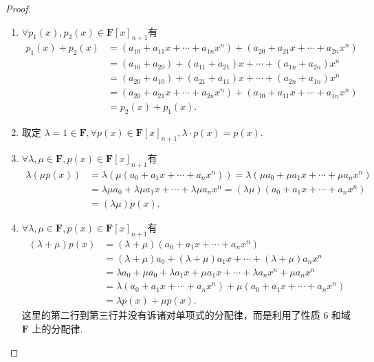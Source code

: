 \begin{proof}
\begin{enumerate}
        \item $\forall p_1(x), p_2(x) \in \mathbf{F}[x]_{n+1}$有
              \begin{align*}
                  p_1(x) + p_2(x)
                   & = (a_{10} + a_{11}x + \cdots + a_{1n}x^n) + (a_{20} + a_{21}x + \cdots + a_{2n}x^n) \\
                   & = (a_{10} + a_{20}) + (a_{11} + a_{21})x + \cdots + (a_{1n} + a_{2n})x^n            \\
                   & = (a_{20} + a_{10}) + (a_{21} + a_{11})x + \cdots + (a_{2n} + a_{1n})x^n            \\
                   & = (a_{20} + a_{21}x + \cdots + a_{2n}x^n) + (a_{10} + a_{11}x + \cdots + a_{1n}x^n) \\
                   & = p_2(x) + p_1(x).
              \end{align*}

        \item 取定 $\lambda = 1 \in \mathbf{F},\forall p(x) \in \mathbf{F}[x]_{n+1}, \lambda \cdot p(x) = p(x)$.

        \item $\forall \lambda, \mu \in \mathbf{F}, p(x) \in \mathbf{F}[x]_{n+1}$有
              \begin{align*}
                  \lambda(\mu p(x)) & = \lambda(\mu(a_0 + a_1x + \cdots + a_nx^n)) = \lambda(\mu a_0 + \mu a_1x + \cdots + \mu a_nx^n)                  \\
                                    & = \lambda \mu a_0 + \lambda \mu a_1x + \cdots + \lambda \mu a_nx^n = (\lambda \mu) (a_0 + a_1x + \cdots + a_nx^n) \\
                                    & = (\lambda \mu)p(x).
              \end{align*}

        \item $\forall \lambda, \mu \in \mathbf{F}, p(x) \in \mathbf{F}[x]_{n+1}$有
              \begin{align*}
                  (\lambda + \mu) p(x)
                   & = (\lambda + \mu)(a_0 + a_1x + \cdots + a_nx^n)                                         \\
                   & = (\lambda + \mu)a_0 + (\lambda + \mu)a_1x + \cdots + (\lambda + \mu)a_nx^n             \\
                   & = \lambda a_0 + \mu a_0 + \lambda a_1x + \mu a_1x+ \cdots + \lambda a_nx^n + \mu a_nx^n \\
                   & = \lambda(a_0 + a_1x + \cdots + a_nx^n) + \mu(a_0 + a_1x + \cdots + a_nx^n)             \\
                   & = \lambda p(x) + \mu p(x).
              \end{align*}
              这里的第二行到第三行并没有诉诸对单项式的分配律，而是利用了性质 6 和域 $\mathbf{F}$ 上的分配律.


\end{enumerate}
\end{proof}
